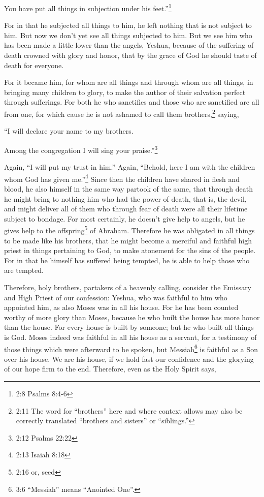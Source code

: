 \myverse{}You have put all things in subjection under his feet.”\footnote{2:8 Psalms 8:4-6
}

For in that he subjected all things to him, he left nothing that is not subject to him. But
now we don’t yet see all things subjected to him.
\myverse{}But we see him who has been made a little lower than the angels, Yeshua, because
of the suffering of death crowned with glory and honor, that by the grace of God he should taste of death
for everyone.

\myverse{}For it became him, for whom are all things and through whom are
all things, in bringing many children to glory, to make the author of their salvation perfect through
sufferings.
\myverse{}For both he who sanctifies and those who are sanctified are all from one,
for which cause he is not ashamed to call them brothers,\footnote{2:11 The word for “brothers” here and where context allows may also be correctly translated “brothers
	and sisters” or “siblings.”}
\myverse{}saying,

“I will declare your name to my brothers.

Among the congregation I will sing your praise.”\footnote{2:12 Psalms 22:22}

\myverse{}Again, “I will put my trust in him.” Again, “Behold, here I am
with the children whom God has given me.”\footnote{2:13 Isaiah 8:18}
\myverse{}Since then the children have shared in flesh and blood, he also himself in
the same way partook of the same, that through death he might bring to nothing him who had the power of
death, that is, the devil,
\myverse{}and might deliver all of them who through fear of death were all their lifetime
subject to bondage.
\myverse{}For most certainly, he doesn’t give help to angels, but he gives help to the
offspring\footnote{2:16 or, seed} of Abraham.
\myverse{}Therefore he was obligated in all things to be made like his brothers, that
he might become a merciful and faithful high priest in things pertaining to God, to make atonement for
the sins of the people.
\myverse{}For in that he himself has suffered being tempted, he is able to help those
who are tempted.


\mychapter{} \myverse*{}Therefore, holy brothers, partakers of a heavenly calling, consider
the Emissary and High Priest of our confession: Yeshua,
\myverse{}who was faithful to him who appointed him, as also Moses was in all his house.
\myverse{}For he has been counted worthy of more glory than Moses, because he who built
the house has more honor than the house.
\myverse{}For every house is built by someone; but he who built all things is God.
\myverse{}Moses indeed was faithful in all his house as a servant, for a testimony of
those things which were afterward to be spoken,
\myverse{}but Messiah\footnote{3:6 “Messiah” means “Anointed One”.} is faithful as a Son over his house. We are his house,
if we hold fast our confidence and the glorying of our hope firm to the end.
\myverse{}Therefore, even as the Holy Spirit says,


